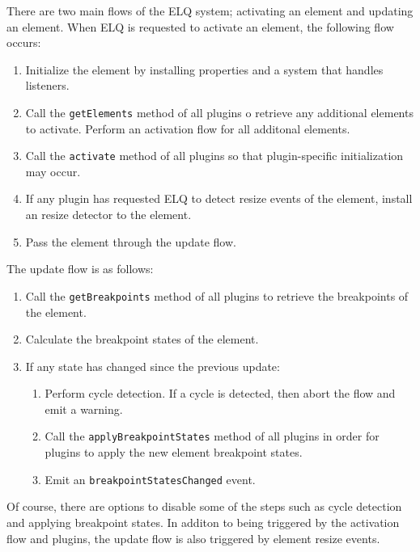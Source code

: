 \documentclass{acm_proc_article-sp}
\newcommand{\code}[1]{\texttt{#1}}
\newcommand{\elq}{ELQ}
\begin{document}
  There are two main flows of the \elq{} system; activating an element and updating an element.
  When \elq{} is requested to activate an element, the following flow occurs:

  \begin{enumerate}
    \item Initialize the element by installing properties and a system that handles listeners.
    \item 
          Call the \code{getElements} method of all plugins o retrieve any additional elements to activate.
          Perform an activation flow for all additonal elements.
    \item Call the \code{activate} method of all plugins so that plugin-specific initialization may occur.
    \item If any plugin has requested \elq{} to detect resize events of the element, install an resize detector to the element.
    \item Pass the element through the update flow.
  \end{enumerate}

  The update flow is as follows:
  \begin{enumerate}
    \item Call the \code{getBreakpoints} method of all plugins to retrieve the breakpoints of the element.
    \item Calculate the breakpoint states of the element.
    \item If any state has changed since the previous update:
    \begin{enumerate}
      \item Perform cycle detection. If a cycle is detected, then abort the flow and emit a warning.
      \item Call the \code{applyBreakpointStates} method of all plugins in order for plugins to apply the new element breakpoint states.
      \item Emit an \code{breakpointStatesChanged} event.
    \end{enumerate}
  \end{enumerate}

  Of course, there are options to disable some of the steps such as cycle detection and applying breakpoint states.
  In additon to being triggered by the activation flow and plugins, the update flow is also triggered by element resize events.
\end{document}
